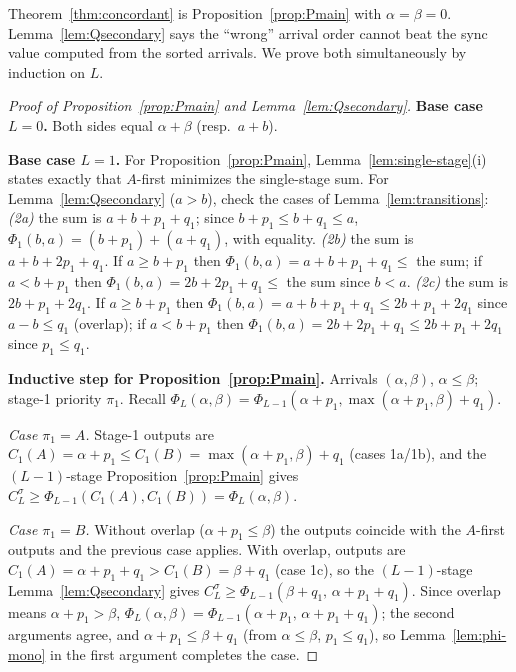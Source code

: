 \documentclass[sn-mathphys,NameDate]{sn-jnl}
\theoremstyle{thmstyleone}
\theoremstyle{thmstylethree}
\theoremstyle{thmstyletwo}
\begin{document}
Theorem~\ref{thm:concordant} is
Proposition~\ref{prop:Pmain} with $\alpha = \beta = 0$.
Lemma~\ref{lem:Qsecondary} says the ``wrong'' arrival order
cannot beat the sync value computed from the sorted arrivals.
We prove both simultaneously by induction on $L$.

\begin{proof}[Proof of Proposition~\ref{prop:Pmain} and
Lemma~\ref{lem:Qsecondary}]
\textbf{Base case $L = 0$.} Both sides equal
$\alpha + \beta$ (resp.\ $a + b$).

\textbf{Base case $L = 1$.} For
Proposition~\ref{prop:Pmain}, Lemma~\ref{lem:single-stage}(i)
states exactly that $A$-first minimizes the single-stage sum.
For Lemma~\ref{lem:Qsecondary} ($a > b$), check the cases of
Lemma~\ref{lem:transitions}:
\emph{(2a)} the sum is $a + b + p_1 + q_1$; since
$b + p_1 \leq b + q_1 \leq a$,
$\Phi_1(b, a) = (b + p_1) + (a + q_1)$, with equality.
\emph{(2b)} the sum is $a + b + 2p_1 + q_1$. If
$a \geq b + p_1$ then
$\Phi_1(b,a) = a + b + p_1 + q_1 \leq$ the sum; if
$a < b + p_1$ then
$\Phi_1(b,a) = 2b + 2p_1 + q_1 \leq$ the sum since $b < a$.
\emph{(2c)} the sum is $2b + p_1 + 2q_1$. If
$a \geq b + p_1$ then
$\Phi_1(b,a) = a + b + p_1 + q_1 \leq 2b + p_1 + 2q_1$ since
$a - b \leq q_1$ (overlap); if $a < b + p_1$ then
$\Phi_1(b,a) = 2b + 2p_1 + q_1 \leq 2b + p_1 + 2q_1$ since
$p_1 \leq q_1$.

\textbf{Inductive step for Proposition~\ref{prop:Pmain}.}
Arrivals $(\alpha, \beta)$, $\alpha \leq \beta$; stage-1
priority $\pi_1$. Recall
$\Phi_L(\alpha,\beta) = \Phi_{L-1}(\alpha + p_1,
\max(\alpha + p_1, \beta) + q_1)$.

\emph{Case $\pi_1 = A$.} Stage-1 outputs are
$C_1(A) = \alpha + p_1 \leq C_1(B) =
\max(\alpha + p_1, \beta) + q_1$ (cases 1a/1b), and the
$(L{-}1)$-stage Proposition~\ref{prop:Pmain} gives
$C_L^\sigma \geq \Phi_{L-1}(C_1(A), C_1(B))
= \Phi_L(\alpha, \beta)$.

\emph{Case $\pi_1 = B$.} Without overlap
($\alpha + p_1 \leq \beta$) the outputs coincide with the
$A$-first outputs and the previous case applies. With overlap,
outputs are $C_1(A) = \alpha + p_1 + q_1 >
C_1(B) = \beta + q_1$ (case 1c), so the $(L{-}1)$-stage
Lemma~\ref{lem:Qsecondary} gives
$C_L^\sigma \geq \Phi_{L-1}(\beta + q_1,\,
\alpha + p_1 + q_1)$. Since overlap means
$\alpha + p_1 > \beta$,
$\Phi_L(\alpha, \beta) = \Phi_{L-1}(\alpha + p_1,\,
\alpha + p_1 + q_1)$; the second arguments agree, and
$\alpha + p_1 \leq \beta + q_1$ (from $\alpha \leq \beta$,
$p_1 \leq q_1$), so Lemma~\ref{lem:phi-mono} in the first
argument completes the case.


\end{proof}
\end{document}
